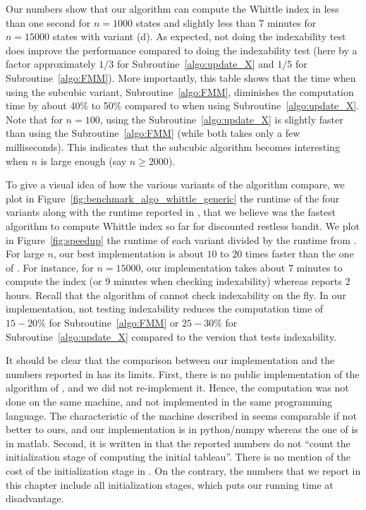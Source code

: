 Our numbers show that our algorithm can compute the Whittle index in less than one second for $n=1000$ states and slightly less than $7$ minutes for $n=15000$ states with variant (d). As expected, not doing the indexability test does improve the performance compared to doing the indexability test (here by a factor approximately $1/3$ for Subroutine~\ref{algo:update_X} and $1/5$ for Subroutine~\ref{algo:FMM}). More importantly, this table shows that the time when using the subcubic variant, Subroutine~\ref{algo:FMM}, diminishes the computation time by about 40\% to 50\% compared to when using Subroutine~\ref{algo:update_X}. Note that for $n=100$, using the Subroutine~\ref{algo:update_X} is slightly faster than using the Subroutine~\ref{algo:FMM} (while both takes only a few milliseconds). This indicates that the subcubic algorithm becomes interesting when $n$ is large enough (say $n\ge2000$).

To give a visual idea of how the various variants of the algorithm compare, we plot in Figure~\ref{fig:benchmark_algo_whittle_generic} the runtime of the four variants along with the runtime reported in \cite{nino2020fast}, that we believe was the fastest algorithm to compute Whittle index so far for discounted restless bandit. We plot in Figure~\ref{fig:speedup} the runtime of each variant divided by the runtime from \cite{nino2020fast}. For large $n$, our best implementation is about $10$ to $20$ times faster than the one of \cite{nino2020fast}. For instance, for $n=15000$, our implementation takes about $7$ minutes to compute the index (or $9$ minutes when checking indexability) whereas \cite{nino2020fast} reports $2$ hours. Recall that the algorithm of \cite{nino2020fast} cannot check indexability on the fly. In our implementation, not testing indexability reduces the computation time of $15-20\%$ for Subroutine~\ref{algo:FMM} or $25-30\%$ for Subroutine~\ref{algo:update_X} compared to the version that tests indexability.

It should be clear that the comparison between our implementation and the numbers reported in \cite{nino2020fast} has its limits. First, there is no public implementation of the algorithm of \cite{nino2020fast}, and we did not re-implement it. Hence, the computation was not done on the same machine, and not implemented in the same programming language. The characteristic of the machine described in \cite{nino2020fast} seems comparable if not better to ours, and our implementation is in python/numpy whereas the one of \cite{nino2020fast} is in matlab.  Second, it is written in \cite{nino2020fast} that the reported numbers do not ``count the initialization stage of computing the initial tableau''. There is no mention of the cost of the initialization stage in \cite{nino2020fast}. On the contrary, the numbers that we report in this chapter include all initialization stages, which puts our running time at disadvantage. 

